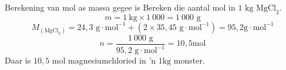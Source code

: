             \label{m38717*secfhsst!!!underscore!!!id641} 
      \begin{wex}{Berekening van mol as massa gegee is}
{
Bereken die aantal mol in $1\text{ kg}$ $\text{MgCl}_{2}$.
     }
{
\label{m38717*id278854}\nopagebreak\noindent{}
    \begin{equation*}
    m = 1~\text{kg} \times 1 ~000=1 ~000\text{ g}
      \end{equation*}
\label{m38717*id278912}\nopagebreak\noindent{}
    \begin{equation*}
    {M}_{(\text{MgCl}_{2})} = 24,3 \text{ g} \cdot \text{mol}^{-1} + (2 \times 35,45 \text{ g} \cdot \text{mol}^{-1}) = 95,2 \text{g} \cdot \text{mol}^{-1}
      \end{equation*}    
      \label{m38717*id279005}\nopagebreak\noindent{}
    \begin{equation*}
    n=\frac{1~000 \text{ g}}{95,2 \text{ g} \cdot \text{mol}^{-1}} = 10,5 \text{mol}
      \end{equation*}
      \label{m38717*id279046}Daar is $10,5 \text{ mol}$ magnesiumchloried in 'n $1 \text{kg}$ monster.
}
    \end{wex}
\label{m38717*secfhsst!!!underscore!!!id832}
